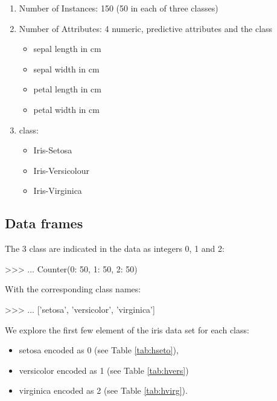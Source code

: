 \begin{enumerate}
\def\labelenumi{\arabic{enumi}.}
\tightlist
\item
  Number of Instances: 150 (50 in each of three classes)
\item
  Number of Attributes: 4 numeric, predictive attributes and the class

  \begin{itemize}
  \tightlist
  \item
    sepal length in cm
  \item
    sepal width in cm
  \item
    petal length in cm
  \item
    petal width in cm
  \end{itemize}
\item
  class:

  \begin{itemize}
  \tightlist
  \item
    Iris-Setosa
  \item
    Iris-Versicolour
  \item
    Iris-Virginica
  \end{itemize}
\end{enumerate}


\subsection{Data frames}\label{data-frames}

The 3 class are indicated in the data as integers 0, 1 and 2:


    	 \begin{coding}
>>> 
... 
Counter({0: 50, 1: 50, 2: 50})
\end{coding}
With the corresponding class names:


    	 \begin{coding}
>>> 
... 
['setosa', 'versicolor', 'virginica']
\end{coding}
We explore the first few element of the iris data set for each class:

\begin{itemize}
\tightlist
\item
  setosa encoded as 0 (see Table \ref{tab:hseto}),
\item
  versicolor encoded as 1 (see Table \ref{tab:hvers})
\item
  virginica encoded as 2 (see Table \ref{tab:hvirg}).
\end{itemize}

